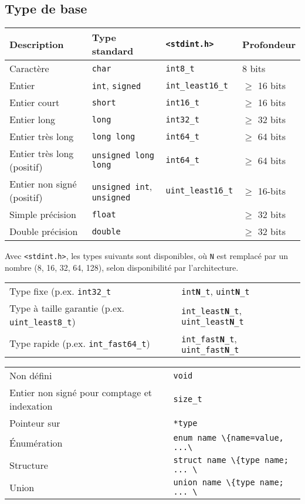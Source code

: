 \documentclass{article}
\newcommand{\cd}{\lstinline}
\begin{document}
\begin{multicols*}{3}
\subsection*{Type de base}
\begin{tabularx}{\linewidth}{X|l|l|l}
  \bf Description & \bf Type standard & \bf \texttt{<stdint.h>} & \bf Profondeur \\
  \hline
  Caractère                   & \cd{char}      & \cd {int8_t} & 8 bits \\
  \hline
  Entier                      & \cd{int}, \cd{signed}  & \cd {int_least16_t} & $\geq$ 16 bits \\
  Entier court                & \cd{short}     & \cd {int16_t} & $\geq$ 16 bits \\
  Entier long                 & \cd{long}      & \cd {int32_t} & $\geq$ 32 bits \\
  Entier très long            & \cd{long long} & \cd {int64_t} & $\geq$ 64 bits \\
  Entier très long (positif)  & \cd{unsigned long long} & \cd {int64_t} & $\geq$ 64 bits \\
  Entier non signé (positif)  & \cd{unsigned int}, \cd{unsigned} & \cd{uint_least16_t} & $\geq$ 16-bits \\
  \hline
  Simple précision            & \cd{float}     &  & $\geq$ 32 bits \\
  Double précision            & \cd{double}    &  & $\geq$ 32 bits \\
\end{tabularx}

Avec \cd{<stdint.h>}, les types suivants sont disponibles, où \cd{N} est remplacé par un nombre (8, 16, 32, 64, 128), selon disponibilité par l'architecture.

\begin{tabularx}{\linewidth}{Xl}
  Type fixe (p.ex. \texttt{int32\_t} & \texttt{int\textbf{N}\_t}, \texttt{uint\textbf{N}\_t} \\
  Type à taille garantie (p.ex. \texttt{uint\_least8\_t}) & \texttt{int\_least\textbf{N}\_t}, \texttt{uint\_least\textbf{N}\_t} \\
  Type rapide (p.ex. \texttt{int\_fast64\_t}) & \texttt{int\_fast\textbf{N}\_t}, \texttt{uint\_fast\textbf{N}\_t} \\
\end{tabularx}

\begin{tabularx}{\linewidth}{Xl}
  Non défini                 & \cd{void} \\
  Entier non signé pour comptage et indexation & \cd{size_t} \\
  Pointeur sur                       & \cd{*type} \\
  Énumération                        & \cd{enum name \{name=value, ...\}}; \\
  Structure                          & \cd{struct name \{type name; ... \}}; \\
  Union                              & \cd{union name \{type name; ... \}}; \\
\end{tabularx}


\end{multicols*}
\end{document}
